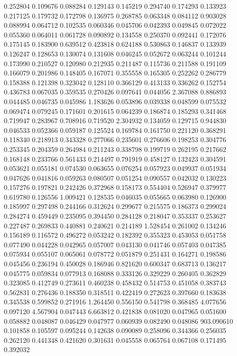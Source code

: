 0.252804
0.109676
0.088284
0.129143
0.145219
0.294740
0.174293
0.133923
0.217125
0.179732
0.172798
0.136975
0.268785
0.063348
0.084112
0.903028
0.088994
0.064712
0.102535
0.060346
0.045706
0.042393
0.049845
0.072022
0.055360
0.064011
0.061728
0.090892
0.134558
0.250370
0.092441
0.172076
0.175145
0.183900
0.639512
0.423818
0.624188
0.530863
0.146837
0.133939
0.126247
0.128653
0.130074
0.131608
0.046245
0.052672
0.063244
0.101244
0.173990
0.210527
0.120980
0.212935
0.211487
0.115736
0.211588
0.191109
0.166079
0.201986
0.148405
0.167071
0.355558
0.165305
0.252262
0.286779
0.158388
0.121398
0.323042
0.128110
0.366129
0.413133
0.336262
0.152754
0.436783
0.067035
0.359535
0.270426
0.097641
0.044056
2.367088
0.886893
0.044485
0.046735
0.045986
1.183626
0.053896
0.039338
0.048599
0.075532
0.069474
0.079245
0.171601
0.201615
0.064239
0.186874
0.185293
0.341468
0.719947
0.283967
0.708916
0.719520
2.304932
0.134059
0.129715
0.944830
0.046533
0.052366
0.059187
0.125524
0.169784
0.161750
0.221120
0.368291
0.118340
0.218913
0.343328
0.277066
0.235601
0.276606
0.198253
0.304776
0.253345
0.204359
0.264984
0.211243
0.338798
0.199719
0.262195
0.217662
0.168148
0.233766
0.561433
0.214497
0.791919
0.458127
0.132423
0.304591
0.053621
0.055181
0.074530
0.063655
0.076254
0.057923
0.049937
0.051934
0.047626
0.041816
0.059263
0.080507
0.051254
0.090557
0.042032
0.130223
0.157276
0.197821
0.242426
0.372968
0.158173
0.554404
0.526947
0.379977
0.619780
0.126556
1.009421
0.128535
0.046035
0.055665
0.063980
0.126900
0.185997
0.297498
0.244166
0.312624
0.299677
0.215575
0.186373
0.299024
0.284274
0.459449
0.235095
0.394450
0.284128
0.218047
0.353337
0.253627
0.227487
0.269833
0.440881
0.240621
0.214189
1.528454
0.261002
0.134246
0.156189
0.116572
0.496272
0.053242
0.182392
0.355323
0.453053
0.051758
0.077490
0.044228
0.042965
0.057007
0.043130
0.041746
0.057403
0.047385
0.075934
0.055107
0.065061
0.078772
0.051879
0.251431
0.164271
0.198586
0.045456
0.236194
0.450028
0.186946
0.821620
0.600347
0.683713
0.136217
0.045775
0.059834
0.077913
0.168088
0.333126
0.329229
0.260405
0.362829
0.323085
0.412749
0.273611
0.460238
0.458432
0.514753
0.451058
0.383743
0.562831
0.276436
0.188350
0.318511
0.422419
0.272623
0.397660
0.183638
0.345538
0.599852
0.271916
1.264450
0.556150
0.541798
0.368485
4.077656
0.097120
4.567904
0.047443
6.663812
0.421838
0.081020
0.047965
0.051600
0.058882
0.048087
0.046429
0.047977
0.060939
0.082490
0.048086
903.090610
0.101858
0.105597
0.095244
0.142638
0.090089
0.258096
0.344366
0.256035
0.262120
0.441348
0.421620
0.301631
0.045558
0.065764
0.067108
0.171495
0.392032
